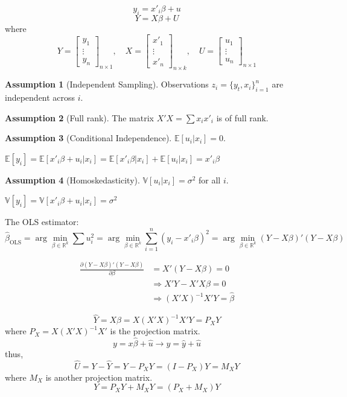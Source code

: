 \documentclass{article}
\begin{document}
\[ y_i = x'_i \beta + u \]
\[ Y = X \beta + U \]
where
\begin{equation*}
  Y = \begin{bmatrix}
    y_1\\
    \vdots\\
    y_n
  \end{bmatrix}_{n \times 1}, \quad
  X = \begin{bmatrix}
    x'_1\\
    \vdots\\
    x'_n
  \end{bmatrix}_{n \times k}, \quad
  U = \begin{bmatrix}
    u_1\\
    \vdots\\
    u_n
  \end{bmatrix}_{n \times 1}
\end{equation*}

\textbf{Assumption 1} (Independent Sampling). Observations $z_i = \{ y_t, x_i \}_{i = 1}^n$ are independent across $i$.

\textbf{Assumption 2} (Full rank). The matrix $X'X = \sum x_i x'_i$ is of full rank.

\textbf{Assumption 3} (Conditional Independence). $\mathbb{E}[u_i | x_i] = 0$.

$\mathbb{E}[y_i] = \mathbb{E}[x'_i \beta + u_i | x_i] = \mathbb{E}[x'_i \beta | x_i] + \mathbb{E}[u_i | x_i] = x'_i \beta$

\textbf{Assumption 4} (Homoskedasticity). $\mathbb{V}[u_i | x_i] = \sigma^2$ for all $i$.

$\mathbb{V}[y_i] = \mathbb{V}[x'_i \beta + u_i | x_i] = \sigma^2$

The OLS estimator:
\[ \hat{\beta}_{\text{OLS}} = \arg\min_{\beta \in \mathbb{R}^k} 
   \sum u_i^2 = \arg\min_{\beta \in \mathbb{R}^k} \sum_{i = 1}^n
   (y_i - x'_i \beta)^2 = \arg\min_{\beta \in \mathbb{R}^k} (Y - X
   \beta)'(Y - X \beta) \]
   
\begin{align*}
  \frac{\partial (Y - X \beta)'(Y - X \beta)}{\partial \beta} &= X'(Y - X
  \beta) = 0\\
  &\Rightarrow X'Y - X'X\beta = 0\\
  &\Rightarrow (X'X)^{-1}X'Y = \hat{\beta}
\end{align*}

\[ \hat{Y} = X\hat{\beta} = X(X'X)^{-1}X'Y = P_X Y \]
where $P_X = X(X'X)^{-1}X'$ is the projection matrix.
\[ y = x\hat{\beta} + \hat{u} \rightarrow y = \hat{y} + \hat{u} \]
thus,
\[ \hat{U} = Y - \hat{Y} = Y - P_X Y = (I - P_X)Y = M_X Y \]
where $M_X$ is another projection matrix.
\[ Y = P_X Y + M_X Y = (P_X + M_X)Y \]
\end{document}
